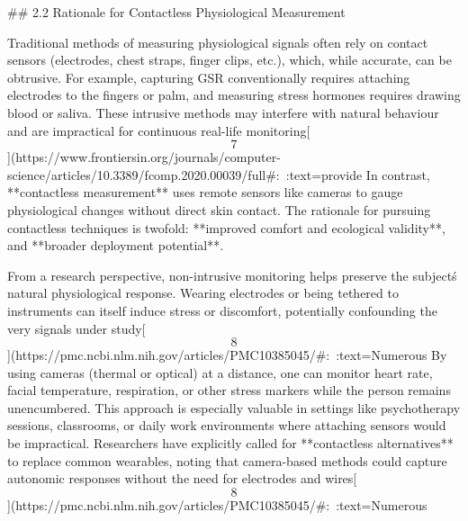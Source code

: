 \documentclass[12pt,a4paper]{article}
\begin{document}
## 2.2 Rationale for Contactless Physiological Measurement

Traditional methods of measuring physiological signals often rely on
contact sensors (electrodes, chest straps, finger clips, etc.), which,
while accurate, can be obtrusive. For example, capturing GSR
conventionally requires attaching electrodes to the fingers or palm, and
measuring stress hormones requires drawing blood or saliva. These
intrusive methods may interfere with natural behaviour and are
impractical for continuous real-life
monitoring[\[7\]](https://www.frontiersin.org/journals/computer-science/articles/10.3389/fcomp.2020.00039/full#:~:text=provide%
In contrast, **contactless measurement** uses remote sensors like
cameras to gauge physiological changes without direct skin contact. The
rationale for pursuing contactless techniques is twofold: **improved
comfort and ecological validity**, and **broader deployment potential**.

From a research perspective, non-intrusive monitoring helps preserve the
subject\'s natural physiological response. Wearing electrodes or being
tethered to instruments can itself induce stress or discomfort,
potentially confounding the very signals under
study[\[8\]](https://pmc.ncbi.nlm.nih.gov/articles/PMC10385045/#:~:text=Numerous%
By using cameras (thermal or optical) at a distance, one can monitor
heart rate, facial temperature, respiration, or other stress markers
while the person remains unencumbered. This approach is especially
valuable in settings like psychotherapy sessions, classrooms, or daily
work environments where attaching sensors would be impractical.
Researchers have explicitly called for **contactless alternatives** to
replace common wearables, noting that camera-based methods could capture
autonomic responses without the need for electrodes and
wires[\[8\]](https://pmc.ncbi.nlm.nih.gov/articles/PMC10385045/#:~:text=Numerous%
\end{document}
